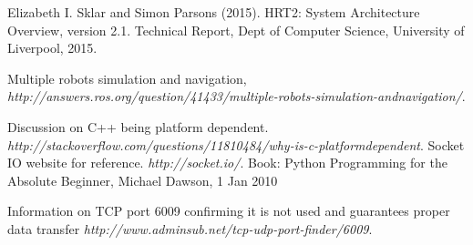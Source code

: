 \documentclass{report}
\begin{document}
\begin{thebibliography}{9}
      Elizabeth I. Sklar and Simon Parsons (2015). HRT2: System Architecture Overview, version 2.1. Technical Report, Dept of Computer Science, University of Liverpool, 2015.

      Multiple robots simulation and navigation, \emph{http://answers.ros.org/question/41433/multiple-robots-simulation-andnavigation/}.

      Discussion on C++ being platform dependent. \emph{http://stackoverflow.com/questions/11810484/why-is-c-platformdependent}.
      Socket IO website for reference. \emph{http://socket.io/}.
       Book: Python Programming for the Absolute Beginner, Michael Dawson, 1 Jan 2010

      Information on TCP port 6009 confirming it is not used and guarantees proper data transfer \emph{http://www.adminsub.net/tcp-udp-port-finder/6009}.


  \end{thebibliography}


 
\end{document}
